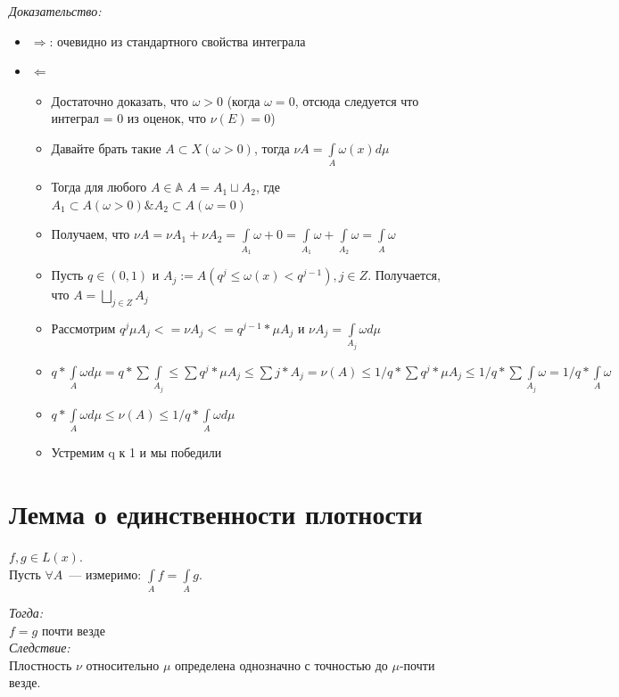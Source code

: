 \documentclass[paper=a4, fontsize=17pt]{article}
\begin{document}
	\emph{Доказательство:}
	 	\begin{itemize}
	 		\item $\Rightarrow$: очевидно из стандартного свойства интеграла
	 		\item $\Leftarrow$\par
	 		\begin{itemize}
	 			\item
	 			Достаточно доказать, что $\omega > 0$ (когда $\omega = 0$, отсюда следуется что интеграл = 0 из оценок, что $\nu(E) = 0$)
	 			\item
	 			Давайте брать такие $A \subset X(\omega > 0)$, тогда $\nu A = \int\limits_A \omega(x) d\mu$
	 			\item
	 			Тогда для любого $A\in\mathbb{A}$ $A = A_1 \sqcup A_2$, где $A_1 \subset A(\omega > 0) \& A_2 \subset A(\omega = 0)$
	 			\item
	 			Получаем, что $\nu A = \nu A_1 + \nu A_2  = \int\limits_{A_1}\omega + 0 = \int\limits_{A_1}\omega + \int\limits_{A_2}\omega = \int\limits_{A}\omega$
	 			\item
	 			Пусть $q\in(0, 1)$ и $A_j:=A(q^j \leq \omega(x) < q^{j - 1}), j \in Z$. Получается, что $A = \bigsqcup_{j \in Z} A_j$
	 			\item
	 			Рассмотрим $q^j \mu A_j <= \nu A_j <= q^{j - 1} * \mu A_j$ и $\nu A_j = \int\limits_{A_j}\omega d\mu$
	 			\item
	 			$q * \int\limits_A \omega d\mu = q * \sum \int\limits_{A_j} \leq \sum q^j * \mu A_j \leq \sum j * A_j = \nu(A) \leq 1 / q * \sum q^j * \mu A_j \leq 1 / q * \sum \int\limits_{A_j} \omega = 1 /q * \int\limits_A \omega$
	 			\item
	 			$q * \int\limits_A \omega d\mu \leq \nu(A) \leq 1 / q * \int\limits_A \omega d\mu$
	 			\item
	 			Устремим q к 1 и мы победили
	 		\end{itemize}
	 	\end{itemize}

\section{Лемма о единственности плотности}
	$f, g \in L(x)$. \\
	Пусть $\forall A$~--- измеримо: $\int\limits_A f = \int\limits_A g$.

	\emph{Тогда: } \\
		$f = g$ почти везде \\
	\emph{Следствие: } \\
		Плостность $\nu$ относительно $\mu$ определена однозначно с точностью до $\mu$-почти везде.
\end{document}
